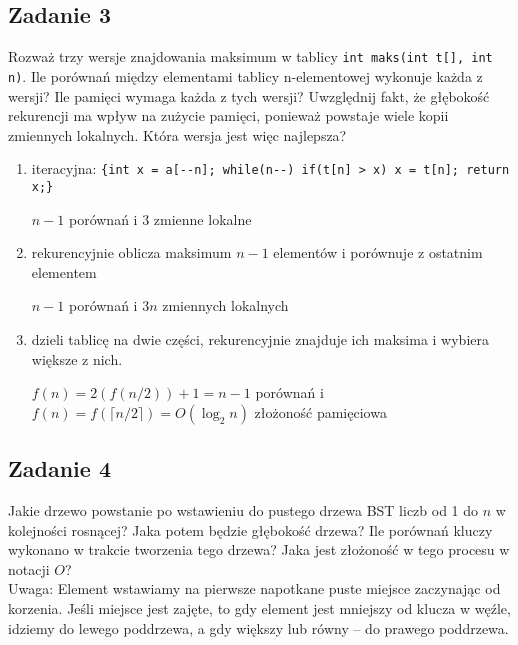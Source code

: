 \documentclass{article}
\begin{document}
\pagebreak
\subsection*{Zadanie 3}
Rozważ trzy wersje znajdowania maksimum w tablicy \verb|int maks(int t[], int n)|.
Ile porównań między elementami tablicy n-elementowej wykonuje każda z wersji? Ile
pamięci wymaga każda z tych wersji? Uwzględnij fakt, że głębokość rekurencji ma wpływ
na zużycie pamięci, ponieważ powstaje wiele kopii zmiennych lokalnych. Która wersja
jest więc najlepsza?
\begin{enumerate}[label=(\alph*)]
    \item iteracyjna: \verb|{int x = a[--n]; while(n--) if(t[n] > x) x = t[n]; return x;}|
          \begin{center}
              $n-1$ porównań i 3 zmienne lokalne
          \end{center}
    \item rekurencyjnie oblicza maksimum $n-1$ elementów i porównuje z ostatnim elementem
          \begin{center}
              $n-1$ porównań i $3n$ zmiennych lokalnych
          \end{center}
    \item dzieli tablicę na dwie części, rekurencyjnie znajduje ich maksima i wybiera większe z nich.
          \begin{center}
              $f(n) = 2(f(n/2)) + 1 = n-1$ porównań i $f(n) = f(\lceil n/2 \rceil) = O(\log_2 n)$ złożoność pamięciowa
          \end{center}
\end{enumerate}

\subsection*{Zadanie 4}
Jakie drzewo powstanie po wstawieniu do pustego drzewa BST liczb od 1 do $n$ w kolejności rosnącej?
Jaka potem będzie głębokość drzewa? Ile porównań kluczy wykonano w
trakcie tworzenia tego drzewa? Jaka jest złożoność w tego procesu w notacji $O$?
\smallskip \\
Uwaga: Element wstawiamy na pierwsze napotkane puste miejsce zaczynając od korzenia.
Jeśli miejsce jest zajęte, to gdy element jest mniejszy od klucza w węźle, idziemy
do lewego poddrzewa, a gdy większy lub równy -- do prawego poddrzewa.
\end{document}
